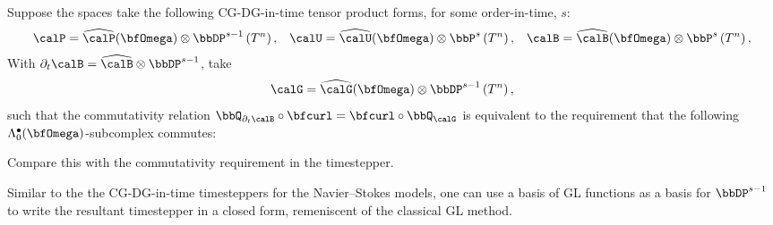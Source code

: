     \line

    \begin{example}
        Suppose the spaces take the following CG-DG-in-time tensor product forms, for some order-in-time, $s$:
        \begin{align}
            \calP  =  \widehat{\calP}(\bfOmega)\otimes\bbDP^{s - 1}\left(T^{n}\right),  &&
            \calU  =  \widehat{\calU}(\bfOmega)\otimes\bbP^{s}\left(T^{n}\right),  &&
            \calB  =  \widehat{\calB}(\bfOmega)\otimes\bbP^{s}\left(T^{n}\right),
        \end{align}
        With $\partial_{t}\calB = \widehat{\calB}\otimes\bbDP^{s - 1}$, take
        \begin{equation}
            \calG  =  \widehat{\calG}(\bfOmega)\otimes\bbDP^{s - 1}\left(T^{n}\right),
        \end{equation}
        such that the commutativity relation $\bbQ_{\partial_{t}\calB}\circ\bfcurl = \bfcurl\circ\bbQ_{\calG}$ is equivalent to the requirement that the following $\Lambda_{0}^{\bullet}(\bfOmega)$-subcomplex commutes:
        \begin{center}\end{center}
        Compare this with the commutativity requirement in the \cite{Laakmann_Hu_Farrell_2022} timestepper.

        Similar to the the CG-DG-in-time timesteppers for the Navier--Stokes models, one can use a basis of GL functions as a basis for $\bbDP^{s - 1}$ to write the resultant timestepper in a closed form, remeniscent of the classical GL method.


\end{example}
